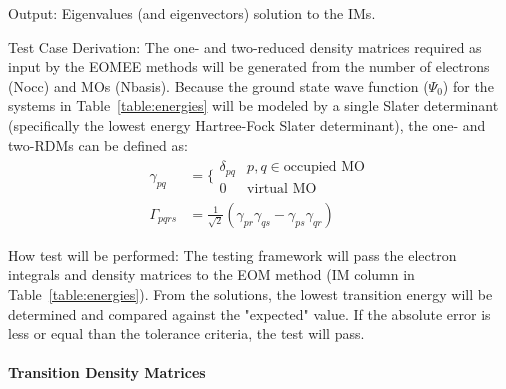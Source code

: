 \documentclass[12pt, titlepage]{article}
\begin{document}
\begin{enumerate}
	Output: Eigenvalues (and eigenvectors) solution to the IMs.
	
	Test Case Derivation: 
	The one- and two-reduced density matrices required  as input by the EOMEE 
	methods will be generated from the number of electrons (Nocc) and MOs 
	(Nbasis). Because the ground state wave function ($\Psi_0$) for the 
	systems in Table~\ref{table:energies} will be modeled 	by a single Slater 
	determinant (specifically the lowest energy Hartree-Fock Slater 
	determinant), the one- and two-RDMs can be defined as:
	\begin{align*}
	\gamma_{pq} &=\Bigg\{
	\begin{matrix}
	\delta_{pq}& p,q \in \text{occupied MO}\\
	0 & \text{virtual MO}
	\end{matrix}\\
	\Gamma_{pqrs} &= \frac{1}{\sqrt{2}}(\gamma_{pr}\gamma_{qs} - 
	\gamma_{ps}\gamma_{qr})
	\end{align*} 
	
	How test will be performed:
	The testing framework will pass the electron integrals and density matrices 
	to the EOM method (IM column in Table~\ref{table:energies}). From the 
	solutions, the lowest transition energy will be determined and compared 
	against the "expected" value. If the absolute error is less or 
	equal than the tolerance criteria, the test will pass.

	
\end{enumerate}


\paragraph{Transition Density Matrices}
\end{document}

